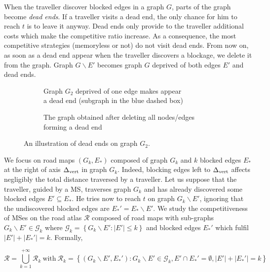 \documentclass[11pt,letterpaper]{article}
\newcommand{\set}[1]{\left\{ #1 \right\}}
\newcommand{\card}[1]{\left| #1 \right|}
\newcommand{\mcalg}{\mathcal{G}}
\newcommand{\mts}{MS}
\newcommand{\deltavert}{\Delta_{\mbox{\scriptsize{vert}}}}
\begin{document}
When the traveller discover blocked edges in a graph $G$, parts of the graph become \textit{dead ends}. If a traveller visits a dead end, the only chance for him to reach $t$ is to leave it anyway. Dead ends only provide to the traveller additional costs which make the competitive ratio increase. As a consequence, the most competitive strategies (memoryless or not) do not visit dead ends. From now on, as soon as a dead end appear when the traveller discovers a blockage, we delete it from the graph. Graph $G\backslash E'$ becomes graph $G$ deprived of both edges $E'$ and dead ends. 

\begin{figure}[b]
\centering
\begin{subfigure}[b]{0.49\columnwidth}
\centering
\scalebox{.32}{}
\caption{Graph $G_2$ deprived of one edge makes appear\\ a dead end (subgraph in the blue dashed box)}
\label{subfig:deadend_1}
\end{subfigure}
\begin{subfigure}[b]{0.49\columnwidth}
\centering
\scalebox{.52}{}
\caption{The graph obtained after deleting all nodes\slash edges forming a dead end}
\label{subfig:deadend_2}
\end{subfigure}
\caption{An illustration of dead ends on graph $G_2$.}
\end{figure}

We focus on road maps $\left(G_k,E_*\right)$ composed of graph $G_k$ and $k$ blocked edges $E_*$ at the right of axis $\deltavert$ in graph $G_k$. Indeed, blocking edges left to $\deltavert$ affects negligibly the total distance traversed by a traveller. Let us suppose that the traveller, guided by a \mts , traverses graph $G_k$ and has already discovered some blocked edges $E' \subseteq E_*$. He tries now to reach $t$ on graph $G_k\backslash E'$, ignoring that the undiscovered blocked edges are $E_*' = E_* \backslash E'$.
We study the competitiveness of \mts es on the road atlas $\mathcal{R}$ composed of road maps with sub-graphs $G_k \backslash E' \in \mcalg_k$ where $\mcalg_k = \set{G_k\backslash E' : \card{E'} \leq k}$ and blocked edges $E_*'$ which fulfil $\card{E'} + \card{E_*'} = k$. Formally,

\begin{equation}
\mathcal{R} = \bigcup\limits_{k=1}^{+\infty} \mathcal{R}_k ~\mbox{with}~ \mathcal{R}_k = \set{\left(G_k\backslash E',E_*'\right): G_k\backslash E' \in \mcalg_k, E' \cap E_*' = \emptyset, \card{E'} + \card{E_*'} = k}
\label{eq:roadatlas}
\end{equation}
\end{document}
